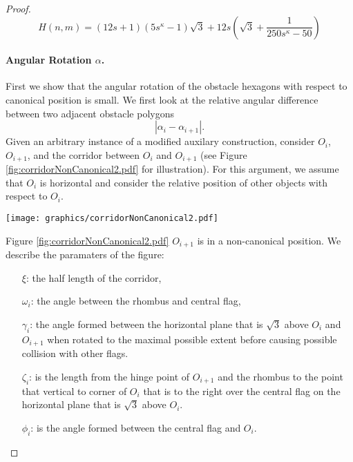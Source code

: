 \documentclass[10pt]{CSUNthesis}
\theoremstyle{plain}%
\theoremstyle{definition}
\theoremstyle{remark}
\newcommand{\lr}[1]{\left( #1 \right)}
\begin{document}
\begin{proof}
\begin{equation}\label{eqn:Hnm}
	H(n,m) = (12s+1)  \lr{5s^\kappa -1}  \sqrt{3} + 12s \lr{\sqrt{3}+ \frac{1}{250s^\kappa -50}}				
\end{equation}\paragraph{Angular Rotation $\alpha$.}
First we show that the angular rotation of the obstacle hexagons with respect to canonical position is small.  
We first look at the relative angular difference between two adjacent obstacle polygons
$$\left\vert \alpha_i - \alpha_{i+1} \right\vert.$$
Given an arbitrary instance of a modified auxilary construction, consider $O_i$, $O_{i+1}$, and the corridor between $O_i$ and $O_{i+1}$ (see Figure \ref{fig:corridorNonCanonical2.pdf} for illustration).  
For this argument, we assume that $O_i$ is horizontal and consider the relative position of other objects with respect to $O_{i}$.

\begin{minipage}{\linewidth}
\begin{center}
\texttt{[image: graphics/corridorNonCanonical2.pdf]}
\label{fig:corridorNonCanonical2.pdf}
\end{center}
\end{minipage}

Figure \ref{fig:corridorNonCanonical2.pdf} $O_{i+1}$ is in a non-canonical position.  We describe the paramaters of the figure:
\begin{itemize}[leftmargin=.75in, rightmargin=.75in]
	\item[$\xi$:] the half length of the corridor,
	\item[$\omega_i$:] the angle between the rhombus and central flag, 
	\item[$\gamma_i$:] the angle formed between the horizontal plane that is $\sqrt{3}$ above $O_i$ and $O_{i+1}$ when rotated to the maximal possible extent before causing possible collision with other flags. 
	\item[$\zeta_i$:]  is the length from the hinge point of $O_{i+1}$ and the rhombus to the point that vertical to corner of $O_i$ that is to the right over the central flag on the horizontal plane that is $\sqrt{3}$ above $O_i$.
	\item[$\phi_i$:] is the angle formed between the central flag and $O_i$.
\end{itemize}


\end{proof}
\end{document}

